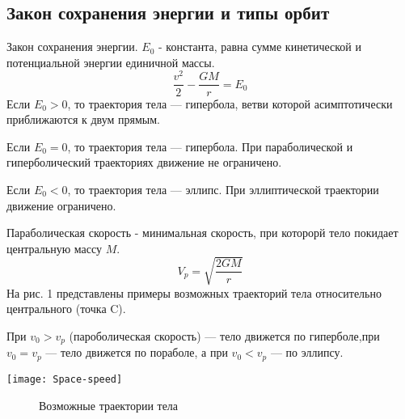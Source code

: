 \subsection{Закон сохранения энергии и типы орбит}
Закон сохранения энергии. $E_0$ - константа, равна сумме кинетической и потенциальной энергии единичной массы.\begin{equation}\frac{v^2}{2}-\frac{GM}{r}=E_0
\end{equation}
Если $E_0>0$, то траектория тела --- гипербола, ветви которой асимптотически приближаются к двум прямым.

Если $E_0=0$, то траектория тела --- гипербола. При параболической и гиперболический траекториях движение не ограничено.

Если $E_0<0$, то траектория тела --- эллипс. При эллиптической траектории движение ограничено.

Параболическая скорость - минимальная скорость, при которорй тело покидает центральную массу $M$.\begin{equation}V_p=\sqrt{\frac{2GM}{r}}
\end{equation}
На рис. 1 представлены примеры возможных траекторий тела относительно центрального (точка C).

При $v_0>v_p$ (пароболическая скорость) --- тело движется по гиперболе,при $v_0=v_p$ --- тело движется по пораболе, а при $v_0<v_p$ --- по эллипсу.
\begin{center}
\texttt{[image: Space-speed]}
\begin{figure}[h!]
\caption{ Возможные траектории тела}
\end{figure}
\end{center}